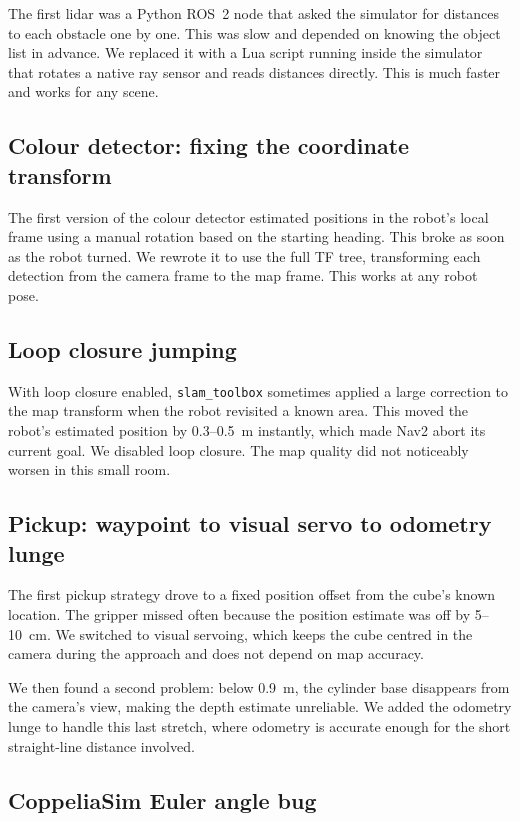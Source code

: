 \documentclass[conference]{IEEEtran}
\begin{document}
The first lidar was a Python ROS~2 node that asked the simulator for
distances to each obstacle one by one.
This was slow and depended on knowing the object list in advance.
We replaced it with a Lua script running inside the simulator that
rotates a native ray sensor and reads distances directly.
This is much faster and works for any scene.

\subsection{Colour detector: fixing the coordinate transform}

The first version of the colour detector estimated positions in the
robot's local frame using a manual rotation based on the starting
heading.
This broke as soon as the robot turned.
We rewrote it to use the full TF tree, transforming each detection
from the camera frame to the map frame.
This works at any robot pose.

\subsection{Loop closure jumping}

With loop closure enabled, \texttt{slam\_toolbox} sometimes applied a
large correction to the map transform when the robot revisited a
known area.
This moved the robot's estimated position by 0.3--0.5~m instantly,
which made Nav2 abort its current goal.
We disabled loop closure.
The map quality did not noticeably worsen in this small room.

\subsection{Pickup: waypoint to visual servo to odometry lunge}

The first pickup strategy drove to a fixed position offset from the
cube's known location.
The gripper missed often because the position estimate was off by
5--10~cm.
We switched to visual servoing, which keeps the cube centred in the
camera during the approach and does not depend on map accuracy.

We then found a second problem: below 0.9~m, the cylinder base
disappears from the camera's view, making the depth estimate
unreliable.
We added the odometry lunge to handle this last stretch, where
odometry is accurate enough for the short straight-line distance
involved.

\subsection{CoppeliaSim Euler angle bug}
\end{document}
